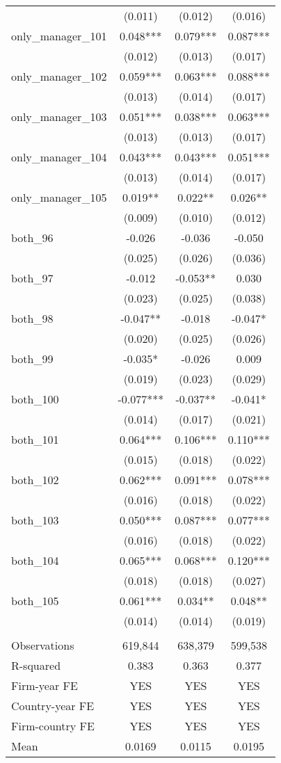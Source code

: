 \begin{tabular}{lccc}
 & (0.011) & (0.012) & (0.016) \\
only\_manager\_101 & 0.048*** & 0.079*** & 0.087*** \\
 & (0.012) & (0.013) & (0.017) \\
only\_manager\_102 & 0.059*** & 0.063*** & 0.088*** \\
 & (0.013) & (0.014) & (0.017) \\
only\_manager\_103 & 0.051*** & 0.038*** & 0.063*** \\
 & (0.013) & (0.013) & (0.017) \\
only\_manager\_104 & 0.043*** & 0.043*** & 0.051*** \\
 & (0.013) & (0.014) & (0.017) \\
only\_manager\_105 & 0.019** & 0.022** & 0.026** \\
 & (0.009) & (0.010) & (0.012) \\
both\_96 & -0.026 & -0.036 & -0.050 \\
 & (0.025) & (0.026) & (0.036) \\
both\_97 & -0.012 & -0.053** & 0.030 \\
 & (0.023) & (0.025) & (0.038) \\
both\_98 & -0.047** & -0.018 & -0.047* \\
 & (0.020) & (0.025) & (0.026) \\
both\_99 & -0.035* & -0.026 & 0.009 \\
 & (0.019) & (0.023) & (0.029) \\
both\_100 & -0.077*** & -0.037** & -0.041* \\
 & (0.014) & (0.017) & (0.021) \\
both\_101 & 0.064*** & 0.106*** & 0.110*** \\
 & (0.015) & (0.018) & (0.022) \\
both\_102 & 0.062*** & 0.091*** & 0.078*** \\
 & (0.016) & (0.018) & (0.022) \\
both\_103 & 0.050*** & 0.087*** & 0.077*** \\
 & (0.016) & (0.018) & (0.022) \\
both\_104 & 0.065*** & 0.068*** & 0.120*** \\
 & (0.018) & (0.018) & (0.027) \\
both\_105 & 0.061*** & 0.034** & 0.048** \\
 & (0.014) & (0.014) & (0.019) \\
 &  &  &  \\
Observations & 619,844 & 638,379 & 599,538 \\
R-squared & 0.383 & 0.363 & 0.377 \\
Firm-year FE & YES & YES & YES \\
Country-year FE & YES & YES & YES \\
Firm-country FE & YES & YES & YES \\
 Mean & 0.0169 & 0.0115 & 0.0195 \\ \hline
\end{tabular}
